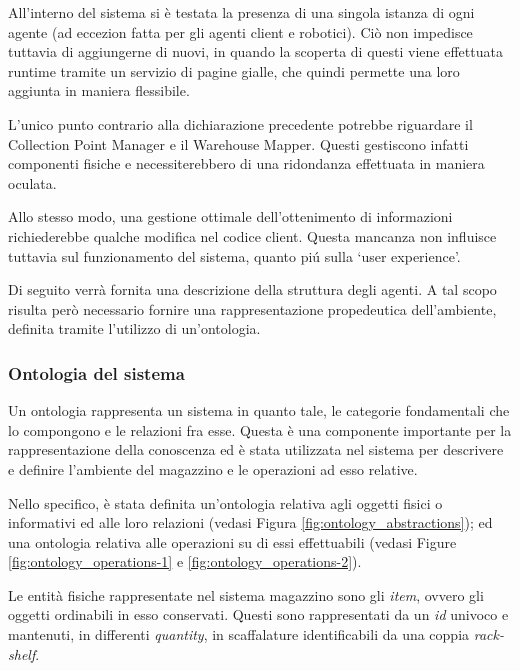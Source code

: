 All'interno del sistema si è testata la presenza di una singola istanza di ogni agente (ad eccezion fatta per gli agenti client e robotici). Ciò non impedisce tuttavia di aggiungerne di nuovi, in quando la scoperta di questi viene effettuata runtime tramite un servizio di pagine gialle, che quindi permette una loro aggiunta in maniera flessibile.

L'unico punto contrario alla dichiarazione precedente potrebbe riguardare il Collection Point Manager e il Warehouse Mapper. Questi gestiscono infatti componenti fisiche e necessiterebbero di una ridondanza effettuata in maniera oculata.

Allo stesso modo, una gestione ottimale dell'ottenimento di informazioni richiederebbe qualche modifica nel codice client. Questa mancanza non influisce tuttavia sul funzionamento del sistema, quanto pi\'u sulla `user experience'.

\parag
Di seguito verrà fornita una descrizione della struttura degli agenti. A tal scopo risulta però necessario fornire una rappresentazione propedeutica dell'ambiente, definita tramite l'utilizzo di un'ontologia.

\subsubsection{Ontologia del sistema}
Un ontologia rappresenta un sistema in quanto tale, le categorie fondamentali che lo compongono e le relazioni fra esse. Questa è una componente importante per la rappresentazione della conoscenza ed è stata utilizzata nel sistema per descrivere e definire l'ambiente del magazzino e le operazioni ad esso relative.

Nello specifico, è stata definita un'ontologia relativa agli oggetti fisici o informativi ed alle loro relazioni (vedasi Figura \ref{fig:ontology_abstractions}); ed una ontologia relativa alle operazioni su di essi effettuabili (vedasi Figure \ref{fig:ontology_operations-1} e \ref{fig:ontology_operations-2}).

\parag
Le entità fisiche rappresentate nel sistema magazzino sono gli \textit{item}, ovvero gli oggetti ordinabili in esso conservati. Questi sono rappresentati da un \textit{id} univoco e mantenuti, in differenti \textit{quantity}, in scaffalature identificabili da una coppia \textit{rack-shelf}.


